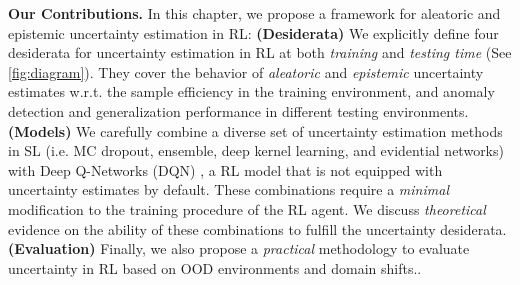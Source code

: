 \textbf{Our Contributions.} In this chapter, we propose a framework for aleatoric and epistemic uncertainty estimation in RL: \textbf{(Desiderata)} We explicitly define four desiderata for uncertainty estimation in RL at both \emph{training} and \emph{testing time} (See \cref{fig:diagram}). They cover the behavior of \emph{aleatoric} and \emph{epistemic} uncertainty estimates w.r.t. the sample efficiency in the training environment, and anomaly detection and generalization performance in different testing environments. \textbf{(Models)} We carefully combine a diverse set of uncertainty estimation methods in SL (i.e. MC dropout, ensemble, deep kernel learning, and evidential networks) with Deep Q-Networks (DQN) \citep{dqn}, a RL model that is not equipped with uncertainty estimates by default. These combinations require a \emph{minimal} modification to the training procedure of the RL agent. We discuss \emph{theoretical} evidence on the ability of these combinations to fulfill the uncertainty desiderata. \textbf{(Evaluation)} Finally, we also propose a \emph{practical} methodology to evaluate uncertainty in RL based on OOD environments and domain shifts..

